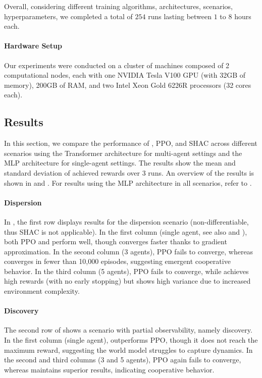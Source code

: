 Overall, considering different training algorithms, architectures, scenarios, hyperparameters, we completed a total of $254$ runs lasting between $1$ to $8$ hours each. 

\paragraph{Hardware Setup}
Our experiments were conducted on a cluster of machines composed of 2 computational nodes, each with one NVIDIA Tesla V100 GPU (with 32GB of memory), 200GB of RAM, and two Intel Xeon Gold 6226R processors (32 cores each).

\subsection{Results}
In this section, we compare the performance of \fname{}, PPO, and SHAC across different scenarios using the Transformer architecture for multi-agent settings and the MLP architecture for single-agent settings. The results show the mean and standard deviation of achieved rewards over 3 runs. An overview of the results is shown in  and . For results using the MLP architecture in all scenarios, refer to .

\paragraph{Dispersion}
In , the first row displays results for the dispersion scenario (non-differentiable, thus SHAC is not applicable). In the first column (single agent, see also  and ), both PPO and \fname{} perform well, though \fname{} converges faster thanks to gradient approximation. In the second column (3 agents), PPO fails to converge, whereas \fname{} converges in fewer than 10,000 episodes, suggesting emergent cooperative behavior. In the third column (5 agents), PPO fails to converge, while \fname{} achieves high rewards (with no early stopping) but shows high variance due to increased environment complexity.

\paragraph{Discovery} 
The second row of  shows a scenario with partial observability, namely discovery. In the first column (single agent), \fname{} outperforms PPO, though it does not reach the maximum reward, suggesting the world model struggles to capture dynamics. In the second and third columns (3 and 5 agents), PPO again fails to converge, whereas \fname{} maintains superior results, indicating cooperative behavior.

